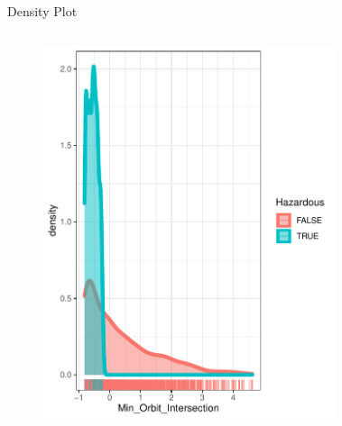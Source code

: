 \documentclass{beamer}
\begin{document}
\begin{frame}{Density Plot}
\begin{columns}  

    \begin{figure}[b]{\textwidth}
    \centering
    \includegraphics[width=\textwidth]{Pic/DENSITY_Min_orbit_intersection.pdf}
    \vspace{4ex}
  \end{figure}
  \begin{figure}[b]{\textwidth}
    \centering

\end{figure}
\end{columns}
\end{frame}
\end{document}
